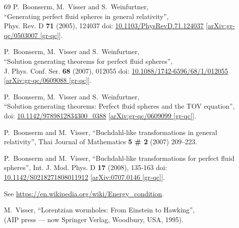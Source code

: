 \documentclass[12pt]{article}
\begin{document}
\begin{thebibliography}{69}
P.~Boonserm, M.~Visser and S.~Weinfurtner,\\
``Generating perfect fluid spheres in general relativity'',\\
Phys. Rev. D \textbf{71} (2005), 124037
doi: \href{https://doi.org/10.1103/PhysRevD.71.124037}{10.1103/PhysRevD.71.124037}
[\href{https://www.arxiv.org/abs/gr-qc/0503007}{arXiv:gr-qc/0503007 [gr-qc]}].

P.~Boonserm, M.~Visser and S.~Weinfurtner,\\
``Solution generating theorems for perfect fluid spheres'',\\
J. Phys. Conf. Ser. \textbf{68} (2007), 012055
doi: \href{https://doi.org/10.1088/1742-6596/68/1/012055}{10.1088/1742-6596/68/1/012055}
[\href{https://www.arxiv.org/abs/gr-qc/0609088}{arXiv:gr-qc/0609088 [gr-qc]}].

P.~Boonserm, M.~Visser and S.~Weinfurtner,\\
``Solution generating theorems: Perfect fluid spheres and the TOV equation'',\\
doi: \href{https://doi.org/10.1142/9789812834300_0388}{10.1142/9789812834300\_0388}
[\href{https://www.arxiv.org/abs/gr-qc/0609099 }{arXiv:gr-qc/0609099 [gr-qc]}].

P.~Boonserm and M.~Visser,
``Buchdahl-like transformations in general relativity'',
Thai Journal of Mathematics \textbf{5 \# 2} (2007) 209--223.

P.~Boonserm and M.~Visser,
``Buchdahl-like transformations for perfect fluid spheres'',
Int. J. Mod. Phys. D \textbf{17} (2008), 135-163
doi: \href{https://doi.org/10.1142/S0218271808011912}{10.1142/S0218271808011912}
[\href{https://www.arxiv.org/abs/0707.0146}{arXiv:0707.0146 [gr-qc]}].


See \url{https://en.wikipedia.org/wiki/Energy\_condition}.

M.~Visser,
``Lorentzian wormholes: From Einstein to Hawking'',\\
(AIP press --- now Springer Verlag, Woodbury, USA, 1995).


\end{thebibliography}
\end{document}
